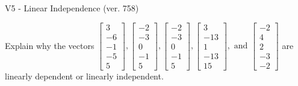 \begin{exercise}
  \begin{exerciseTitle}V5 - Linear Independence (ver. 758)\end{exerciseTitle}
  \begin{exerciseStatement}
    Explain why the vectors \(\left[\begin{array}{r}
3 \\
-6 \\
-1 \\
-5 \\
5
\end{array}\right] , \left[\begin{array}{r}
-2 \\
-3 \\
0 \\
-1 \\
5
\end{array}\right] , \left[\begin{array}{r}
-2 \\
-3 \\
0 \\
-1 \\
5
\end{array}\right] , \left[\begin{array}{r}
3 \\
-13 \\
1 \\
-13 \\
15
\end{array}\right] , \text{ and } \left[\begin{array}{r}
-2 \\
4 \\
2 \\
-3 \\
-2
\end{array}\right]\) are linearly dependent or linearly independent.	



\end{exerciseStatement}
\end{exercise}
